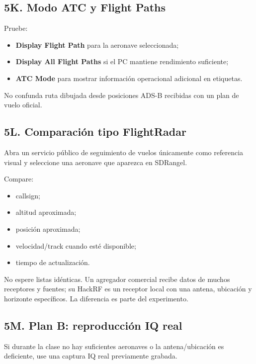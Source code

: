 \subsection{5K. Modo ATC y Flight Paths}

Pruebe:

\begin{itemize}
    \item \textbf{Display Flight Path} para la aeronave seleccionada;
    \item \textbf{Display All Flight Paths} si el PC mantiene rendimiento suficiente;
    \item \textbf{ATC Mode} para mostrar información operacional adicional en etiquetas.
\end{itemize}

No confunda ruta dibujada desde posiciones ADS-B recibidas con un plan de vuelo oficial.

\subsection{5L. Comparación tipo FlightRadar}

Abra un servicio público de seguimiento de vuelos únicamente como referencia visual y seleccione una aeronave que aparezca en SDRangel.

Compare:

\begin{itemize}
    \item callsign;
    \item altitud aproximada;
    \item posición aproximada;
    \item velocidad/track cuando esté disponible;
    \item tiempo de actualización.
\end{itemize}

\begin{nota}
No espere listas idénticas. Un agregador comercial recibe datos de muchos receptores y fuentes; su HackRF es un receptor local con una antena, ubicación y horizonte específicos. La diferencia es parte del experimento.
\end{nota}

\subsection{5M. Plan B: reproducción IQ real}

Si durante la clase no hay suficientes aeronaves o la antena/ubicación es deficiente, use una captura IQ real previamente grabada.

